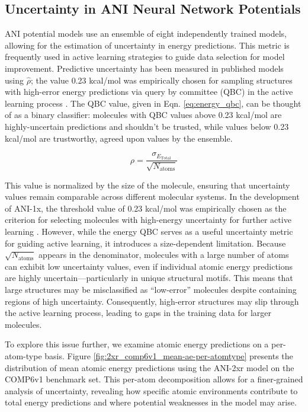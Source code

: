\subsection{Uncertainty in ANI Neural Network Potentials}
\label{subsec:ANI_uncertainty}

ANI potential models use an ensemble of eight independently trained models, allowing for the estimation of uncertainty in energy predictions.
This metric is frequently used in active learning strategies to guide data selection for model improvement.
Predictive uncertainty has been measured in published models using $\hat{\rho}$; the value 0.23 kcal/mol was empirically chosen for sampling structures with high-error energy predictions via query by committee (QBC) in the active learning process \cite{ani-1x}.
The QBC value, given in Eqn. \ref{eq:energy_qbc}, can be thought of as a binary classifier: molecules with QBC values above 0.23 kcal/mol are highly-uncertain predictions and shouldn't be trusted, while values below 0.23 kcal/mol are trustworthy, agreed upon values by the ensemble.

\begin{equation}
\rho = \frac{\sigma_{E_{\text{Total}}}}{\sqrt{N_{\text{atoms}}}}
\label{eq:energy_qbc}
\end{equation}

This value is normalized by the size of the molecule, ensuring that uncertainty values remain comparable across different molecular systems. 
In the development of ANI-1x, the threshold value of 0.23 kcal/mol was empirically chosen as the criterion for selecting molecules with high-energy uncertainty for further active learning \cite{ani-1x}.
However, while the energy QBC serves as a useful uncertainty metric for guiding active learning, it introduces a size-dependent limitation. 
Because $\sqrt{N_\text{atoms}}$ appears in the denominator, molecules with a large number of atoms can exhibit low uncertainty values, even if individual atomic energy predictions are highly uncertain---particularly in unique structural motifs. 
This means that large structures may be misclassified as “low-error” molecules despite containing regions of high uncertainty. 
Consequently, high-error structures may slip through the active learning process, leading to gaps in the training data for larger molecules.

To explore this issue further, we examine atomic energy predictions on a per-atom-type basis. 
Figure \ref{fig:2xr_comp6v1_mean-ae-per-atomtype} presents the distribution of mean atomic energy predictions using the ANI-2xr model on the COMP6v1 benchmark set. 
This per-atom decomposition allows for a finer-grained analysis of uncertainty, revealing how specific atomic environments contribute to total energy predictions and where potential weaknesses in the model may arise.

